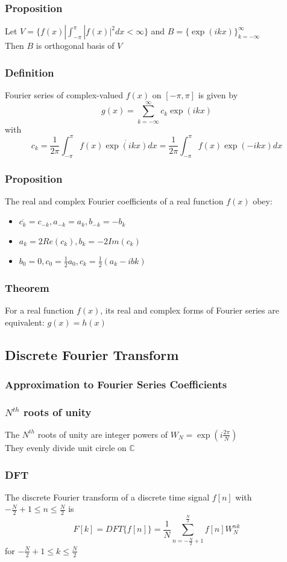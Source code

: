 \documentclass[11pt]{article}
\newcommand{\C}{{\mathbb{C}}}
\begin{document}
\subsubsection*{Proposition}
Let $V = \{f(x)|\int_{-\pi}^{\pi}|f(x)|^2dx<\infty\}$ and $B=\{\exp(ikx)\}_{k=-\infty}^\infty$ \\
Then $B$ is orthogonal basis of $V$
\subsubsection*{Definition}
Fourier series of complex-valued $f(x)$ on $[-\pi,\pi]$ is given by 
\[g(x) = \sum_{k=-\infty}^{\infty}c_k\exp(ikx)\]
with \[c_k = \frac{1}{2\pi}\int_{-\pi}^{\pi}f(x)\overline{\exp(ikx)}dx = \frac{1}{2\pi}\int_{-\pi}^{\pi}f(x)\exp(-ikx)dx\]
\subsubsection*{Proposition}
The real and complex Fourier coefficients of a real function $f(x)$ obey:
\begin{itemize}
  \item $\overline{c_k} = c_{-k}, a_{-k} = a_k, b_{-k} = -b_k$
  \item $a_k=2Re(c_k), b_k = -2Im(c_k)$
  \item $b_0=0,c_0=\frac{1}{2}a_0,c_k=\frac{1}{2}(a_k-ibk)$
\end{itemize}
\subsubsection*{Theorem}
For a real function $f(x)$, its real and complex forms of Fourier series are equivalent: $g(x)=h(x)$
\subsection{Discrete Fourier Transform}
\subsubsection{Approximation to Fourier Series Coefficients}
\subsubsection*{$N^{th}$ roots of unity}
The $N^{th}$ roots of unity are integer powers of $W_N=\exp(i\frac{2\pi}{N})$ \\
They evenly divide unit circle on $\C$
\subsubsection*{DFT}
The discrete Fourier transform of a discrete time signal $f[n]$ with $-\frac{N}{2}+1\leq n\leq\frac{N}{2}$ is 
\[F[k] = DFT\{f[n]\} = \frac{1}{N}\sum_{n=-\frac{N}{2}+1}^{\frac{N}{2}}f[n]W_N^{nk}\]
for $-\frac{N}{2}+1\leq k\leq \frac{N}{2}$
\end{document}
